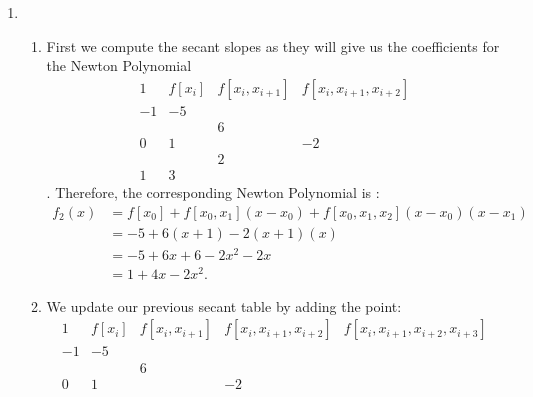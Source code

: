 \documentclass{report}
\begin{document}
\begin{solution}
	\begin{enumerate}[label=(\alph*)]
		\item
		      \begin{enumerate}[label=(\roman*)]
			      \item First we compute the secant slopes as they will give us the coefficients for the Newton Polynomial
			            \[
				            \begin{array}{c|ccc}
					            1  & f[x_i] & f[x_i, x_{i+1}] & f[x_i, x_{i+1},x_{i+2}] \\
					            \hline
					            -1 & -5     &                 &                         \\
					               &        & 6               &                         \\
					            0  & 1      &                 & -2                      \\
					               &        & 2               &                         \\
					            1  & 3      &                 &
				            \end{array}
			            \].
			            Therefore, the corresponding Newton Polynomial is :
			            \begin{align*}
				            f_2(x) & = f[x_0]+ f[x_0,x_1](x-x_0) + f[x_0,x_1,x_2](x-x_0)(x-x_1) \\
				                   & = -5+6(x+1) -2(x+1)(x) \\
				                   & = -5 + 6x + 6 -2x^{2} - 2x \\
				                   & =  1 + 4x -2x^2
				            .\end{align*}
			      \item We update our previous secant table by adding the point:
			            \[
				            \begin{array}{c|cccc}
					            1  & f[x_i] & f[x_i, x_{i+1}] & f[x_i, x_{i+1},x_{i+2}] & f[x_i, x_{i+1},x_{i+2},x_{i+3}] \\
					            \hline
					            -1 & -5     &                 &                         &                                 \\
					               &        & 6               &                         &                                 \\
					            0  & 1      &                 & -2                      &                                 \\

\end{array}\]
\end{enumerate}
\end{enumerate}
\end{solution}
\end{document}
